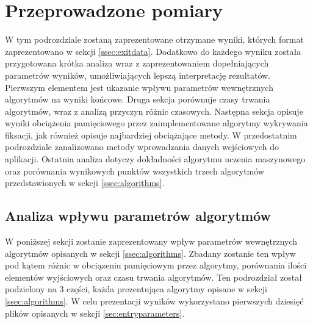 \section{Przeprowadzone pomiary}
W tym podrozdziale zostaną zaprezentowane otrzymane wyniki, których format zaprezentowano w sekcji \ref{ssec:exitdata}. Dodatkowo do każdego wyniku została przygotowana krótka analiza wraz z zaprezentowaniem dopełniających parametrów wyników, umożliwiających lepszą interpretację rezultatów. Pierwszym elementem jest ukazanie wpływu parametrów wewnętrznych algorytmów na wyniki końcowe. Druga sekcja porównuje czasy trwania algorytmów, wraz z analizą przyczyn różnic czasowych. Następna sekcja opisuje wyniki obciążenia pamięciowego przez zaimplementowane algorytmy wykrywania fiksacji, jak również opisuje najbardziej obciążające metody. W przedostatnim podrozdziale zanalizowano metody wprowadzania danych wejściowych do aplikacji. Ostatnia analiza dotyczy dokładności algorytmu uczenia maszynowego oraz porównania wynikowych punktów wszystkich trzech algorytmów przedstawionych w sekcji \ref{ssec:algorithms}.
\subsection{Analiza wpływu parametrów algorytmów}
\label{ssec:queryparameters}
W poniższej sekcji zostanie zaprezentowany wpływ parametrów wewnętrznych algorytmów opisanych w sekcji \ref{ssec:algorithms}. Zbadany zostanie ten wpływ pod kątem różnic w obciązeniu pamięciowym przez algorytmy, porównania ilości elementów wyjściowych oraz czasu trwania algorytmów. Ten podrozdział został podzielony na 3 części, każda prezentująca algorytmy opisane w sekcji \ref{ssec:algorithms}. W celu prezentacji wyników wykorzystano pierwszych dziesięć plików opisanych w sekcji \ref{sec:entryparameters}.
